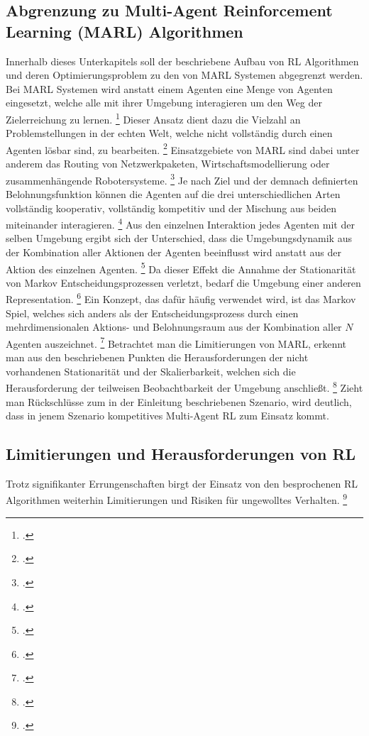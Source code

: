 \subsection{Abgrenzung zu Multi-Agent Reinforcement Learning (MARL) Algorithmen}
Innerhalb dieses Unterkapitels soll der beschriebene Aufbau von RL Algorithmen und deren Optimierungsproblem zu den von MARL Systemen abgegrenzt werden.
Bei MARL Systemen wird anstatt einem Agenten eine Menge von Agenten eingesetzt, welche alle mit ihrer Umgebung interagieren um den Weg der Zielerreichung zu lernen. \footcite[Vgl.][S. 6]{Wong.2022}
Dieser Ansatz dient dazu die Vielzahl an Problemstellungen in der echten Welt, welche nicht vollständig durch einen Agenten lösbar sind, zu bearbeiten. \footcite[Vgl.][S. 1]{Canese.2021}
Einsatzgebiete von MARL sind dabei unter anderem das Routing von Netzwerkpaketen, Wirtschaftsmodellierung oder zusammenhängende Robotersysteme. \footcite[Vgl.][S. 1]{Canese.2021}
Je nach Ziel und der demnach definierten Belohnungsfunktion können die Agenten auf die drei unterschiedlichen Arten vollständig kooperativ, vollständig kompetitiv und der Mischung aus beiden miteinander interagieren. \footcite[Vgl.][S. 8f.]{Canese.2021}
Aus den einzelnen Interaktion jedes Agenten mit der selben Umgebung ergibt sich der Unterschied, dass die Umgebungsdynamik aus der Kombination aller Aktionen der Agenten beeinflusst wird anstatt aus der Aktion des einzelnen Agenten. \footcite[Vgl.][S. 2]{Wong.2022}
Da dieser Effekt die Annahme der Stationarität von Markov Entscheidungsprozessen verletzt, bedarf die Umgebung einer anderen Representation. \footcite[Vgl.][S. 6]{Wong.2022}
Ein Konzept, das dafür häufig verwendet wird, ist das Markov Spiel, welches sich anders als der Entscheidungsprozess durch einen mehrdimensionalen Aktions- und Belohnungsraum aus der Kombination aller $N$ Agenten auszeichnet. \footcite[Vgl.][S. 4]{Canese.2021}
Betrachtet man die Limitierungen von MARL, erkennt man aus den beschriebenen Punkten die Herausforderungen der nicht vorhandenen Stationarität und der Skalierbarkeit, welchen sich die Herausforderung der teilweisen Beobachtbarkeit der Umgebung anschließt. \footcite[Vgl.][S. 9ff.]{Canese.2021}
Zieht man Rückschlüsse zum in der Einleitung beschriebenen Szenario, wird deutlich, dass in jenem Szenario kompetitives Multi-Agent RL zum Einsatz kommt. 

\subsection{Limitierungen und Herausforderungen von RL}
Trotz signifikanter Errungenschaften birgt der Einsatz von den besprochenen RL Algorithmen weiterhin Limitierungen und Risiken für ungewolltes Verhalten. \footcite[Vgl.][S. 7]{Li.2019}

